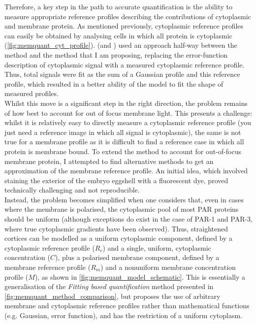 \documentclass[12pt]{"report"}
\begin{document}
Therefore, a key step in the path to accurate quantification is the ability to measure appropriate reference profiles describing the contributions of cytoplasmic and membrane protein. As mentioned previously, cytoplasmic reference profiles can easily be obtained by analysing cells in which all protein is cytoplasmic (\cref{fig:memquant_cyt_profile}). \textcite{Reich2019a} (and \textcite{Reich2019}) used an approach half-way between the \textcite{Gross2018} method and the method that I am proposing, replacing the error-function description of cytoplasmic signal with a measured cytoplasmic reference profile. Thus, total signals were fit as the sum of a Gaussian profile and this reference profile, which resulted in a better ability of the model to fit the shape of measured profiles.\\

Whilst this move is a significant step in the right direction, the problem remains of how best to account for out of focus membrane light. This presents a challenge: whilst it is relatively easy to directly measure a cytoplasmic reference profile (you just need a reference image in which all signal is cytoplasmic), the same is not true for a membrane profile as it is difficult to find a reference case in which all protein is membrane bound. To extend the method to account for out-of-focus membrane protein, I attempted to find alternative methods to get an approximation of the membrane reference profile. An initial idea, which involved staining the exterior of the embryo eggshell with a fluorescent dye, proved technically challenging and not reproducible.\\

Instead, the problem becomes simplified when one considers that, even in cases where the membrane is polarised, the cytoplasmic pool of most PAR proteins should be uniform (although exceptions do exist in the case of PAR-1 and PAR-3, where true cytoplasmic gradients have been observed). Thus, straightened cortices can be modelled as a uniform cytoplasmic component, defined by a cytoplasmic reference profile ($R_c$) and a single, uniform, cytoplasmic concentration ($C$), plus a polarised membrane component, defined by a membrane reference profile ($R_m$) and a nonuniform membrane concentration profile ($M$), as shown in \cref{fig:memquant_model_schematic}. This is essentially a generalisation of the \textit{Fitting based quantification} method presented in \cref{fig:memquant_method_comparison}, but proposes the use of arbitrary membrane and cytoplasmic reference profiles rather than mathematical functions (e.g. Gaussian, error function), and has the restriction of a uniform cytoplasm.\\
\end{document}
